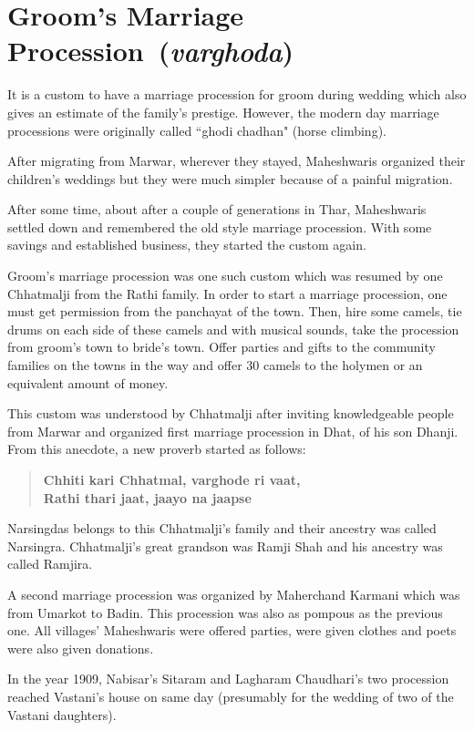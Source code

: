 \chapter{Groom's Marriage Procession~(\textit{varghoda})}
It is a custom to have a marriage procession for groom during wedding which
also gives an estimate of the family's prestige. However, the modern day
marriage processions were originally called ``ghodi chadhan" (horse climbing).

After migrating from Marwar, wherever they stayed, Maheshwaris organized their
children's weddings but they were much simpler because of a painful migration.

After some time, about after a couple of generations in Thar, Maheshwaris
settled down and remembered the old style marriage procession. With some
savings and established business, they started the custom again.

Groom's marriage procession was one such custom which was resumed by one
Chhatmalji from the Rathi family. In order to start a marriage procession, one
must get permission from the panchayat of the town. Then, hire some camels, tie
drums on each side of these camels and with musical sounds, take the procession
from groom's town to bride's town. Offer parties and gifts to the community
families on the towns in the way and offer 30 camels to the holymen or an
equivalent amount of money.

This custom was understood by Chhatmalji after inviting knowledgeable people
from Marwar and organized first marriage procession in Dhat, of his son Dhanji.
From this anecdote, a new proverb started as follows:

\begin{quote}
\textbf{Chhiti kari Chhatmal, varghode ri vaat,\\
Rathi thari jaat, jaayo na jaapse}
\end{quote}

Narsingdas belongs to this Chhatmalji's family and their ancestry was called
Narsingra. Chhatmalji's great grandson was Ramji Shah and his ancestry was
called Ramjira.

A second marriage procession was organized by Maherchand Karmani which was from
Umarkot to Badin. This procession was also as pompous as the previous one. All
villages' Maheshwaris were offered parties, were given clothes and poets were
also given donations.

In the year 1909, Nabisar's Sitaram and Lagharam Chaudhari's two procession
reached Vastani's house on same day (presumably for the wedding of two of the
Vastani daughters).


